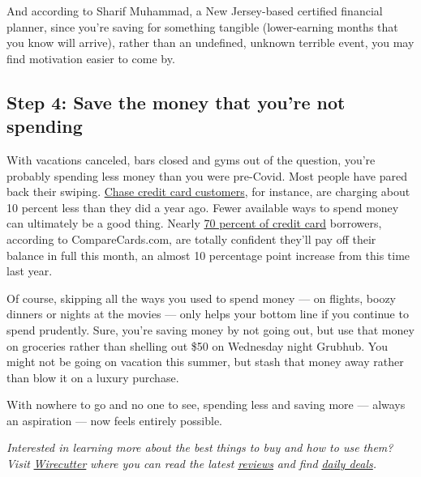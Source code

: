 And according to Sharif Muhammad, a New Jersey-based certified financial
planner, since you're saving for something tangible (lower-earning
months that you know will arrive), rather than an undefined, unknown
terrible event, you may find motivation easier to come by.

\hypertarget{step-4-save-the-money-that-youre-not-spending}{%
\subsection{Step 4: Save the money that you're not
spending}\label{step-4-save-the-money-that-youre-not-spending}}

With vacations canceled, bars closed and gyms out of the question,
you're probably spending less money than you were pre-Covid. Most people
have pared back their swiping.
\href{https://www.businessinsider.com/economic-outlook-credit-card-spending-data-recovery-stalling-recession-jpmorgan-2020-7}{Chase
credit card customers}, for instance, are charging about 10 percent less
than they did a year ago. Fewer available ways to spend money can
ultimately be a good thing. Nearly
\href{https://www.comparecards.com/blog/credit-card-confidence-index/}{70
percent of credit card} borrowers, according to CompareCards.com, are
totally confident they'll pay off their balance in full this month, an
almost 10 percentage point increase from this time last year.

Of course, skipping all the ways you used to spend money --- on flights,
boozy dinners or nights at the movies --- only helps your bottom line if
you continue to spend prudently. Sure, you're saving money by not going
out, but use that money on groceries rather than shelling out \$50 on
Wednesday night Grubhub. You might not be going on vacation this summer,
but stash that money away rather than blow it on a luxury purchase.

With nowhere to go and no one to see, spending less and saving more ---
always an aspiration --- now feels entirely possible.

\emph{Interested in learning more about the best things to buy and how
to use them? Visit}
\href{https://www.nytimes3xbfgragh.onion/wirecutter/?utm_source=nytimes\&utm_medium=referral\&utm_campaign=wcsmarterliving\&utm_content=covid-budget}{\emph{Wirecutter}}
\emph{where you can read the latest}
\href{https://www.nytimes3xbfgragh.onion/wirecutter/reviews?utm_source=nytimes\&utm_medium=referral\&utm_campaign=wcsmarterliving\&utm_content=covid-budget}{\emph{reviews}}
\emph{and find}
\href{https://www.nytimes3xbfgragh.onion/wirecutter/deals/?utm_source=nytimes\&utm_medium=referral\&utm_campaign=wcsmarterliving\&utm_content=covid-budget}{\emph{daily
deals}}\emph{.}

